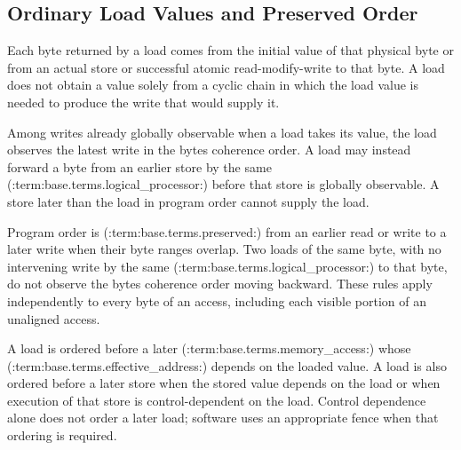 \subsection{Ordinary Load Values and Preserved Order}
Each byte returned by a load comes from the initial value of that physical byte or from an actual store or successful
atomic read-modify-write to that byte. A load does not obtain a value solely from a cyclic chain in which the load
value is needed to produce the write that would supply it.

Among writes already globally observable when a load takes its value, the load observes the latest write in the
byte\textquotesingle{}s coherence order. A load may instead forward a byte from an earlier store by the same (:term:base.terms.logical_processor:) before
that store is globally observable. A store later than the load in program order cannot supply the load.

Program order is (:term:base.terms.preserved:) from an earlier read or write to a later write when their byte ranges overlap. Two loads
of the same byte, with no intervening write by the same (:term:base.terms.logical_processor:) to that byte, do not observe the byte\textquotesingle{}s coherence order moving
backward. These rules apply independently to every byte of an access, including each visible portion of an unaligned
access.

A load is ordered before a later (:term:base.terms.memory_access:) whose (:term:base.terms.effective_address:) depends on the loaded value. A load is also
ordered before a later store when the stored value depends on the load or when execution of that store is
control-dependent on the load. Control dependence alone does not order a later load; software uses an appropriate
fence when that ordering is required.
